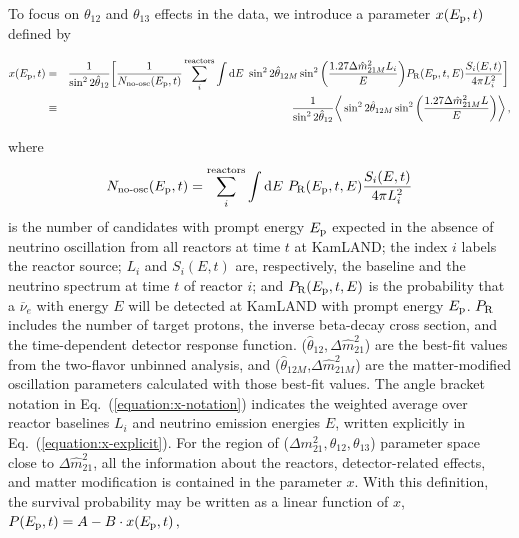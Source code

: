 \documentclass[aps,prc,twocolumn,groupedaddress,showpacs,amsmath,amssymb,floatfix,superscriptaddress]{revtex4}
\begin{document}
To focus on $\theta_{12}$ and $\theta_{13}$ effects in the data, we introduce a parameter $x(E_{\rm p},t)$ defined by
\begin{widetext}
\begin{eqnarray}
x(E_{\rm p},t) &=&\frac{1}{\sin^2{2\hat{\theta}_{12}}}\bigg{[}\frac{1}{N_{\rm{no\mathchar`-osc}}(E_{\rm p},t)}\sum_{i}^{\rm reactors} \int \mathrm{d}E ~ \sin^22\hat{\theta}_{12M}\sin^2\bigg{(}\frac{1.27\Delta \hat{m}^2_{21M}L_{i}}{E}\bigg{)}P_{\rm{R}}(E_{\rm p},t,E)\frac{S_{i}(E,t)}{4\pi L^2_{i}} \bigg{]}\, \label{equation:x-explicit}\\
&\equiv&\frac{1}{\sin^2{2\hat{\theta}_{12}}}\bigg{\langle}\sin^22\hat{\theta}_{12M}\sin^2\bigg{(}\frac{1.27\Delta \hat{m}^2_{21M}L}{E}\bigg{)}\bigg{\rangle}\,, \label{equation:x-notation}
\end{eqnarray}
\end{widetext}
where 
\begin{eqnarray}
N_{\rm{no\mathchar`-osc}}(E_{\rm p},t)=\sum_{i}^{\rm reactors}\int \mathrm{d}E ~ P_{\rm{R}}(E_{\rm p},t,E)\frac{S_{i}(E,t)}{4\pi L^2_{i}} \label{equation:defineSDet}
\end{eqnarray}
is the number of candidates with prompt energy $E_{\rm p}$ expected in the absence of neutrino oscillation from all reactors at time $t$ at KamLAND; the index $i$ labels the reactor source; $L_{i}$ and $S_{i}(E,t)$ are, respectively, the baseline and the neutrino spectrum at time $t$ of reactor $i$; and $P_{\rm{R}}(E_{\rm p},t,E)$ is the probability that a $\overline{\nu}_{e}$ with energy $E$ will be detected at KamLAND with prompt energy $E_{\rm p}$. $P_{\rm{R}}$ includes the number of target protons, the inverse beta-decay cross section, and the time-dependent detector response function. ($\hat{\theta}_{12},\Delta \hat{m}^2_{21}$) are the best-fit values from the two-flavor unbinned analysis, and  ($\hat{\theta}_{12M}$,$\Delta \hat{m}^2_{21M}$) are the matter-modified oscillation parameters calculated with those best-fit values.  The angle bracket notation in \mbox{Eq.~(\ref{equation:x-notation})} indicates the weighted average over reactor baselines $L_{i}$ and neutrino emission energies $E$, written explicitly in \mbox{Eq.~(\ref{equation:x-explicit})}.
For the region of ($\Delta m^2_{21},\theta_{12},\theta_{13}$) parameter space close to $\Delta \hat{m}^2_{21}$, all the information about the reactors, detector-related effects, and matter modification is contained in the parameter $x$.  With this definition, the survival probability may be written as a linear function of $x$, $P(E_{\rm p},t)=A - B\cdot x(E_{\rm p},t)\,,$  
\end{document}
